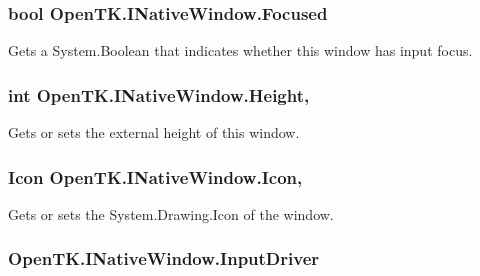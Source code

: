 \hypertarget{interface_open_t_k_1_1_i_native_window_aaa2ef631c8bd4bcbef3374dfaeb50299}{
\subsubsection[{Focused}]{\setlength{\rightskip}{0pt plus 5cm}bool Open\-T\-K.\-I\-Native\-Window.\-Focused\hspace{0.3cm}{\ttfamily [get]}}}\label{interface_open_t_k_1_1_i_native_window_aaa2ef631c8bd4bcbef3374dfaeb50299}


Gets a System.\-Boolean that indicates whether this window has input focus. 

\hypertarget{interface_open_t_k_1_1_i_native_window_a717a701ae1d8a942f55825f9372bd41f}{
\subsubsection[{Height}]{\setlength{\rightskip}{0pt plus 5cm}int Open\-T\-K.\-I\-Native\-Window.\-Height\hspace{0.3cm}{\ttfamily [get]}, {\ttfamily [set]}}}\label{interface_open_t_k_1_1_i_native_window_a717a701ae1d8a942f55825f9372bd41f}


Gets or sets the external height of this window. 

\hypertarget{interface_open_t_k_1_1_i_native_window_a16cffc51a5dd62c9d9dbf9a089620754}{
\subsubsection[{Icon}]{\setlength{\rightskip}{0pt plus 5cm}Icon Open\-T\-K.\-I\-Native\-Window.\-Icon\hspace{0.3cm}{\ttfamily [get]}, {\ttfamily [set]}}}\label{interface_open_t_k_1_1_i_native_window_a16cffc51a5dd62c9d9dbf9a089620754}


Gets or sets the System.\-Drawing.\-Icon of the window. 

\hypertarget{interface_open_t_k_1_1_i_native_window_aca0d227f0b84dd93ba5135cc9f51ce56}{
\subsubsection[{Input\-Driver}]{ Open\-T\-K.\-I\-Native\-Window.\-Input\-Driver\hspace{0.3cm}{\ttfamily [get]}}}\label{interface_open_t_k_1_1_i_native_window_aca0d227f0b84dd93ba5135cc9f51ce56}



